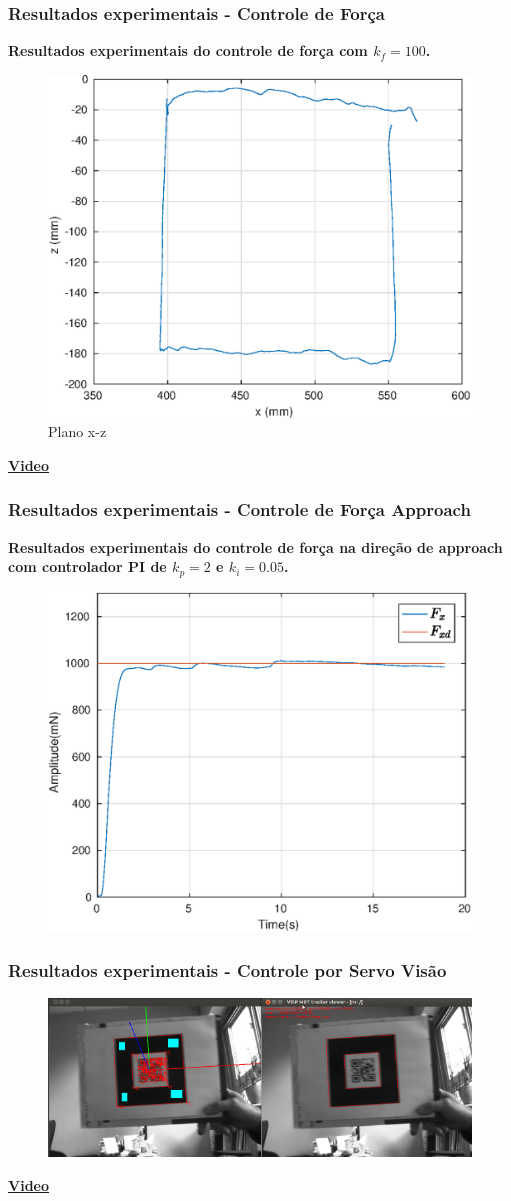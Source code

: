 \documentclass{beamer}
\begin{document}
\begin{frame}
\frametitle{Resultados experimentais - Controle de Força}
\textbf{Resultados experimentais do controle de força com $k_f = 100$.}
\begin{figure}[H]
\includegraphics[width=0.5\linewidth]{./img/float2/xz.eps}
\caption{Plano x-z}
\end{figure}%
\begin{center}
\href{run:forca.mp4}{\textbf{Video}}%
\end{center}
\end{frame}

\begin{frame}
\frametitle{Resultados experimentais - Controle de Força Approach}
\textbf{Resultados experimentais do controle de força na direção de approach com controlador PI de $k_p = 2$ e $k_i = 0.05$. }
\begin{figure}[H]
\includegraphics[width=0.5\linewidth]{./img/force1000_kp2_ki005/Fx.eps}
\end{figure}%
\begin{center}
\end{center}
\end{frame}

\begin{frame}
\frametitle{Resultados experimentais - Controle por Servo Visão}
\begin{figure}[H]
\includegraphics[width=0.5\linewidth]{./img/tracker_viewer-small.png}
\end{figure}%
\begin{center}
\href{run:forca.mp4}{\textbf{Video}}%
\end{center}
\end{frame}
\end{document}

